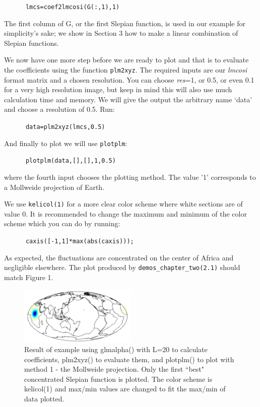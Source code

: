 \documentclass[11pt]{article}
\begin{document}
\verb+		lmcs=coef2lmcosi(G(:,1),1)+

The first column of G, or the first Slepian function, is used in our example for simplicity's sake; we show in Section 3 how to make a linear combination of Slepian functions.

We now have one more step before we are ready to plot and that is to evaluate the coefficients using the function \verb+plm2xyz+. The required inputs are our \textit{lmcosi} format matrix and a chosen resolution. You can choose \textit{res}=1, or 0.5, or even 0.1 for a very high resolution image, but keep in mind this will also use much calculation time and memory.  We will give the output the arbitrary name `data' and choose  a resolution of 0.5. Run:

\verb+		data=plm2xyz(lmcs,0.5)+

And finally to plot we will use \verb+plotplm+:

\verb+		plotplm(data,[],[],1,0.5)+

where the fourth input chooses the plotting method. The value '1' corresponds to a Mollweide projection of Earth.

We use \verb+kelicol(1)+ for a more clear color scheme where white sections are of value 0. It is recommended to change the maximum and minimum of the color scheme which you can do by running:

\verb+		caxis([-1,1]*max(abs(caxis)));+

As expected, the fluctuations are concentrated on the center of Africa and negligible elsewhere. The plot produced by \verb|demos_chapter_two(2.1)| should match Figure 1.

\begin{figure}[H]
  \centering
  \includegraphics[width=0.5\textwidth]{figures/figure1.png}
  \caption{Result of example using glmalpha() with L=20 to calculate coefficients, plm2xyz() to evaluate them, and plotplm() to plot with method 1 - the Mollweide projection. Only the first ``best" concentrated Slepian function is plotted. The color scheme is kelicol(1) and max/min values are changed to fit the max/min of data plotted.}
\label{figure1}
\end{figure}
\end{document}
